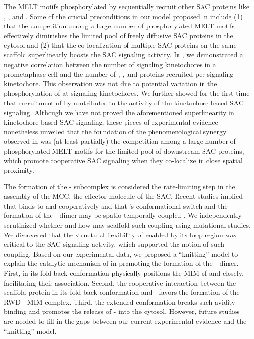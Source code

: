 The MELT motifs phosphorylated by  sequentially recruit other SAC proteins like , , and  \cite{Ji2017eLife}. Some of the crucial preconditions in our model proposed in  include (1) that the competition among a large number of phosphorylated MELT motifs effectively diminishes the limited pool of freely diffusive SAC proteins in the cytosol and (2) that the co-localization of multiple SAC proteins on the same  scaffold superlinearly boosts the SAC signaling activity. In , we demonstrated a negative correlation between the number of signaling kinetochores in a prometaphase cell and the number of , , and  proteins recruited per signaling kinetochore. This observation was not due to potential variation in the phosphorylation of  at signaling kinetochores. We further showed for the first time that recruitment of  by   contributes to the activity of the kinetochore-based SAC signaling. Although we have not proved the aforementioned superlinearity in kinetochore-based SAC signaling, these pieces of experimental evidence nonetheless unveiled that the foundation of the phenomenological synergy observed in  was (at least partially) the competition among a large number of phosphorylated MELT motifs for the limited pool of downstream SAC proteins, which promote cooperative SAC signaling when they co-localize in close spatial proximity.

The formation of the - subcomplex is considered the rate-limiting step in the assembly of the MCC, the effector molecule of the SAC. Recent studies implied that  binds to  and  cooperatively and that 's conformational switch and the formation of the - dimer may be spatio-temporally coupled \cite{BUB1-CDC20-MAD1, Tripartite}. We independently scrutinized whether and how  may scaffold such coupling using mutational studies. We discovered that the structural flexibility of  enabled by its loop region was critical to the SAC signaling activity, which supported the notion of such coupling. Based on our experimental data, we proposed a ``knitting'' model to explain the catalytic mechanism of  in promoting the formation of the - dimer. First,  in its fold-back conformation physically positions the MIM of  and  closely, facilitating their association. Second, the cooperative interaction between the scaffold protein  in its fold-back conformation and - favors the formation of the RWD---MIM complex. Third, the extended conformation breaks such avidity binding and promotes the release of - into the cytosol. However, future studies are needed to fill in the gaps between our current experimental evidence and the ``knitting'' model.


